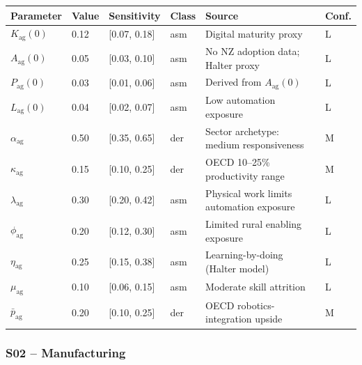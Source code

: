 \documentclass[11pt,a4paper]{article}
\begin{document}
\begin{center}
\begin{tabular}{llllll}
\toprule
Parameter & Value & Sensitivity & Class & Source & Conf.\\
\midrule
$K_{\text{ag}}(0)$ & 0.12 & [0.07, 0.18] & asm & Digital maturity proxy & L \\
$A_{\text{ag}}(0)$ & 0.05 & [0.03, 0.10] & asm & No NZ adoption data; Halter proxy & L \\
$P_{\text{ag}}(0)$ & 0.03 & [0.01, 0.06] & asm & Derived from $A_{\text{ag}}(0)$ & L \\
$L_{\text{ag}}(0)$ & 0.04 & [0.02, 0.07] & asm & Low automation exposure & L \\
$\alpha_{\text{ag}}$ & 0.50 & [0.35, 0.65] & der & Sector archetype: medium responsiveness & M \\
$\kappa_{\text{ag}}$ & 0.15 & [0.10, 0.25] & der & OECD 10--25\% productivity range & M \\
$\lambda_{\text{ag}}$ & 0.30 & [0.20, 0.42] & asm & Physical work limits automation exposure & L \\
$\phi_{\text{ag}}$ & 0.20 & [0.12, 0.30] & asm & Limited rural enabling exposure & L \\
$\eta_{\text{ag}}$ & 0.25 & [0.15, 0.38] & asm & Learning-by-doing (Halter model) & L \\
$\mu_{\text{ag}}$ & 0.10 & [0.06, 0.15] & asm & Moderate skill attrition & L \\
$\bar{p}_{\text{ag}}$ & 0.20 & [0.10, 0.25] & der & OECD robotics-integration upside & M \\
\bottomrule
\end{tabular}
\end{center}

\subsubsection*{S02 -- Manufacturing}
\end{document}
